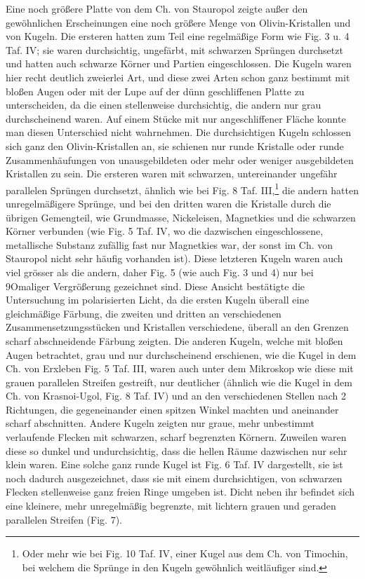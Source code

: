 \documentclass[a4paper, 11pt, oneside]{article}
\begin{document}
Eine noch größere Platte von dem Ch. von Stauropol zeigte außer den gewöhnlichen Erscheinungen eine noch größere Menge von Olivin-Kristallen und von Kugeln. Die ersteren hatten zum Teil eine regelmäßige Form wie Fig. 3 u. 4 Taf. IV; sie waren durchsichtig, ungefärbt, mit schwarzen Sprüngen durchsetzt und hatten auch schwarze Körner und Partien eingeschlossen. Die Kugeln waren hier recht deutlich zweierlei Art, und diese zwei Arten schon ganz bestimmt mit bloßen Augen oder mit der Lupe auf der dünn geschliffenen Platte zu unterscheiden, da die einen stellenweise durchsichtig, die andern nur grau durchscheinend waren. Auf einem Stücke mit nur angeschliffener Fläche konnte man diesen Unterschied nicht wahrnehmen. Die durchsichtigen Kugeln schlossen sich ganz den Olivin-Kristallen an, sie schienen nur runde Kristalle oder runde Zusammenhäufungen von unausgebildeten oder mehr oder weniger ausgebildeten Kristallen zu sein. Die ersteren waren mit schwarzen, untereinander ungefähr parallelen Sprüngen durchsetzt, ähnlich wie bei Fig. 8 Taf. III,\footnote{Oder mehr wie bei Fig. 10 Taf. IV, einer Kugel aus dem Ch. von Timochin, bei welchem die Sprünge in den Kugeln gewöhnlich weitläufiger sind.} die andern hatten unregelmäßigere Sprünge, und bei den dritten waren die Kristalle durch die übrigen Gemengteil, wie Grundmasse, Nickeleisen, Magnetkies und die schwarzen Körner verbunden (wie Fig. 5 Taf. IV, wo die dazwischen eingeschlossene, metallische Substanz zufällig fast nur Magnetkies war, der sonst im Ch. von Stauropol nicht sehr häufig vorhanden ist). Diese letzteren Kugeln waren auch viel grösser als die andern, daher Fig. 5 (wie auch Fig. 3 und 4) nur bei 9Omaliger Vergrößerung gezeichnet sind. Diese Ansicht bestätigte die Untersuchung im polarisierten Licht, da die ersten Kugeln überall eine gleichmäßige Färbung, die zweiten und dritten an verschiedenen Zusammensetzungsstücken und Kristallen verschiedene, überall an den Grenzen scharf abschneidende Färbung zeigten. Die anderen Kugeln, welche mit bloßen Augen betrachtet, grau und nur durchscheinend erschienen, wie die Kugel in dem Ch. von Erxleben Fig. 5 Taf. III, waren auch unter dem Mikroskop wie diese mit grauen parallelen Streifen gestreift, nur deutlicher (ähnlich wie die Kugel in dem Ch. von Krasnoi-Ugol, Fig. 8 Taf. IV) und an den verschiedenen Stellen nach 2 Richtungen, die gegeneinander einen spitzen Winkel machten und aneinander scharf abschnitten. Andere Kugeln zeigten nur graue, mehr unbestimmt verlaufende Flecken mit schwarzen, scharf begrenzten Körnern. Zuweilen waren diese so dunkel und undurchsichtig, dass die hellen Räume dazwischen nur sehr klein waren. Eine solche ganz runde Kugel ist Fig. 6 Taf. IV dargestellt, sie ist noch dadurch ausgezeichnet, dass sie mit einem durchsichtigen, von schwarzen Flecken stellenweise ganz freien Ringe umgeben ist. Dicht neben ihr befindet sich eine kleinere, mehr unregelmäßig begrenzte, mit lichtern grauen und geraden parallelen Streifen (Fig. 7).
\end{document}
